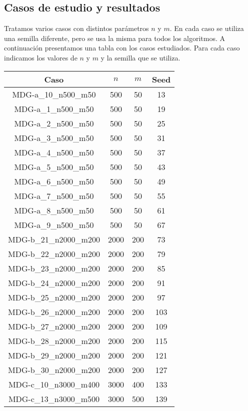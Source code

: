 \documentclass{article}
\begin{document}
\subsection{Casos de estudio y resultados}

Tratamos varios casos con distintos parámetros $n$ y $m$. En cada caso se utiliza una semilla diferente, pero se usa la misma para todos los algoritmos.
A continuación presentamos una tabla con los casos estudiados. Para cada caso indicamos los valores de $n$ y $m$ y la semilla
que se utiliza.

\begin{table}[H]
	\centering
	\begin{tabular}{|cccc|}
		\hline
		Caso & $n$ & $m$ & Seed\\ \hline
		MDG-a\_10\_n500\_m50 & 500 & 50 & 13\\
		MDG-a\_1\_n500\_m50 & 500 & 50 & 19\\
		MDG-a\_2\_n500\_m50 & 500 & 50 & 25\\
		MDG-a\_3\_n500\_m50 & 500 & 50 & 31\\
		MDG-a\_4\_n500\_m50 & 500 & 50 & 37\\
		MDG-a\_5\_n500\_m50 & 500 & 50 & 43\\
		MDG-a\_6\_n500\_m50 & 500 & 50 & 49\\
		MDG-a\_7\_n500\_m50 & 500 & 50 & 55\\
		MDG-a\_8\_n500\_m50 & 500 & 50 & 61\\
		MDG-a\_9\_n500\_m50 & 500 & 50 & 67\\
		MDG-b\_21\_n2000\_m200 & 2000 & 200 & 73\\
		MDG-b\_22\_n2000\_m200 & 2000 & 200 & 79\\
		MDG-b\_23\_n2000\_m200 & 2000 & 200 & 85\\
		MDG-b\_24\_n2000\_m200 & 2000 & 200 & 91\\
		MDG-b\_25\_n2000\_m200 & 2000 & 200 & 97\\
		MDG-b\_26\_n2000\_m200 & 2000 & 200 & 103\\
		MDG-b\_27\_n2000\_m200 & 2000 & 200 & 109\\
		MDG-b\_28\_n2000\_m200 & 2000 & 200 & 115\\
		MDG-b\_29\_n2000\_m200 & 2000 & 200 & 121\\
		MDG-b\_30\_n2000\_m200 & 2000 & 200 & 127\\
		MDG-c\_10\_n3000\_m400 & 3000 & 400 & 133\\
		MDG-c\_13\_n3000\_m500 & 3000 & 500 & 139\\

\end{tabular}
\end{table}
\end{document}
